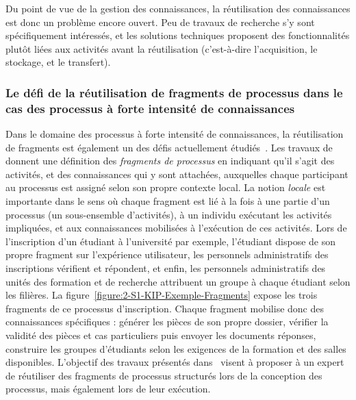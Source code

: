 \bigskip

Du point de vue de la gestion des connaissances, la réutilisation des connaissances est donc un problème encore ouvert.
Peu de travaux de recherche s'y sont spécifiquement intéressés, et les solutions techniques proposent des fonctionnalités plutôt liées aux activités avant la réutilisation (c'est-à-dire l'acquisition, le stockage, et le transfert).


\bigskip


\subsubsection{Le défi de la réutilisation de fragments de processus dans le cas des processus à forte intensité de connaissances}
\label{subsubsection:Contexte:KIP-RevueLitterature:Reutilisation:KIP}

Dans le domaine des processus à forte intensité de connaissances, la réutilisation de fragments est également un des défis actuellement étudiés~\cite{boissier2019challenges}.
Les travaux de~\cite{eberle2009process}\cite{eberle2010process} donnent une définition des \textit{fragments de processus} en indiquant qu'il s'agit des activités, et des connaissances qui y sont attachées, auxquelles chaque participant au processus est assigné selon son propre contexte local.
La notion \textit{locale} est importante dans le sens où chaque fragment est lié à la fois à une partie d'un processus (un sous-ensemble d'activités), à un individu exécutant les activités impliquées, et aux connaissances mobilisées à l'exécution de ces activités.
Lors de l'inscription d'un étudiant à l'université par exemple, l'étudiant dispose de son propre fragment sur l'expérience utilisateur, les personnels administratifs des inscriptions vérifient et répondent, et enfin, les personnels administratifs des unités des formation et de recherche attribuent un groupe à chaque étudiant selon les filières.
La figure~\ref{figure:2-S1-KIP-Exemple-Fragments} expose les trois fragments de ce processus d'inscription.
Chaque fragment mobilise donc des connaissances spécifiques : générer les pièces de son propre dossier, vérifier la validité des pièces et cas particuliers puis envoyer les documents réponses, construire les groupes d'étudiants selon les exigences de la formation et des salles disponibles.
L'objectif des travaux présentés dans~\cite{eberle2010process} visent à proposer à un expert de réutiliser des fragments de processus structurés lors de la conception des processus, mais également lors de leur exécution.


